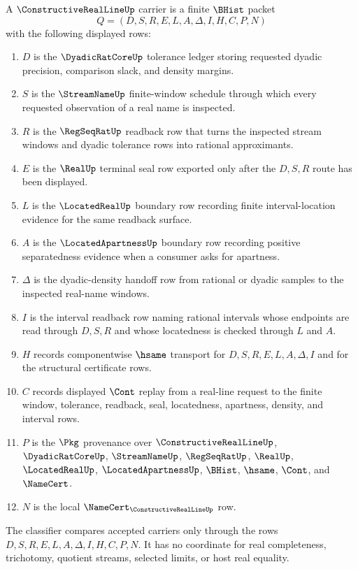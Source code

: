 \begin{definition}
\label{def:constructive-real-line-carrier}
A $\ConstructiveRealLineUp$ carrier is a finite $\BHist$ packet
$$
Q=(D,S,R,E,L,A,\Delta,I,H,C,P,N)
$$
with the following displayed rows:
\begin{enumerate}
\item $D$ is the $\DyadicRatCoreUp$ tolerance ledger storing requested dyadic precision, comparison slack, and density margins.
\item $S$ is the $\StreamNameUp$ finite-window schedule through which every requested observation of a real name is inspected.
\item $R$ is the $\RegSeqRatUp$ readback row that turns the inspected stream windows and dyadic tolerance rows into rational approximants.
\item $E$ is the $\RealUp$ terminal seal row exported only after the $D,S,R$ route has been displayed.
\item $L$ is the $\LocatedRealUp$ boundary row recording finite interval-location evidence for the same readback surface.
\item $A$ is the $\LocatedApartnessUp$ boundary row recording positive separatedness evidence when a consumer asks for apartness.
\item $\Delta$ is the dyadic-density handoff row from rational or dyadic samples to the inspected real-name windows.
\item $I$ is the interval readback row naming rational intervals whose endpoints are read through $D,S,R$ and whose locatedness is checked through $L$ and $A$.
\item $H$ records componentwise $\hsame$ transport for $D,S,R,E,L,A,\Delta,I$ and for the structural certificate rows.
\item $C$ records displayed $\Cont$ replay from a real-line request to the finite window, tolerance, readback, seal, locatedness, apartness, density, and interval rows.
\item $P$ is the $\Pkg$ provenance over $\ConstructiveRealLineUp$, $\DyadicRatCoreUp$, $\StreamNameUp$, $\RegSeqRatUp$, $\RealUp$, $\LocatedRealUp$, $\LocatedApartnessUp$, $\BHist$, $\hsame$, $\Cont$, and $\NameCert$.
\item $N$ is the local $\NameCert_{\ConstructiveRealLineUp}$ row.
\end{enumerate}
The classifier compares accepted carriers only through the rows $D,S,R,E,L,A,\Delta,I,H,C,P,N$. It has no coordinate for real completeness, trichotomy, quotient streams, selected limits, or host real equality.
\end{definition}

